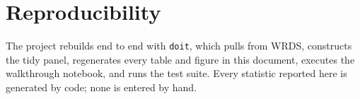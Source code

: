 \documentclass[11pt]{article}
\begin{document}
\section*{Reproducibility}

The project rebuilds end to end with \texttt{doit}, which pulls from WRDS,
constructs the tidy panel, regenerates every table and figure in this document,
executes the walkthrough notebook, and runs the test suite. Every statistic
reported here is generated by code; none is entered by hand.
\end{document}
